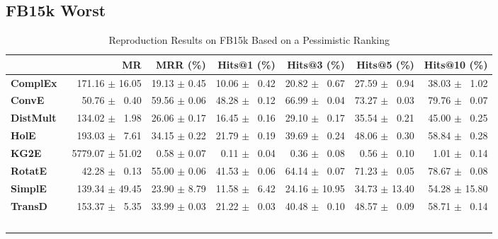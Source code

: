 \documentclass[journal]{IEEEtran}
\begin{document}
\subsection{FB15k Worst}
    \begin{table*}
        \caption{Reproduction Results on FB15k Based on a Pessimistic Ranking}
        \label{tab:fb15k_full_results_pessimistic_ranking}
        \centering
        \begin{tabular}{lrrrrrr}
\toprule
{} &                MR &      MRR (\%) &    Hits@1 (\%) &    Hits@3 (\%) &    Hits@5 (\%) &   Hits@10 (\%) \\
\midrule
\textbf{ComplEx } &  $\phantom{5}$$\phantom{5}$171.16 $\pm$ 16.05 &  19.13 $\pm$ 0.45 &  10.06 $\pm$ $\phantom{5}$0.42 &  20.82 $\pm$ $\phantom{5}$0.67 &  27.59 $\pm$ $\phantom{5}$0.94 &  38.03 $\pm$ $\phantom{5}$1.02 \\
\textbf{ConvE   } &  $\phantom{5}$$\phantom{5}$$\phantom{5}$50.76 $\pm$ $\phantom{5}$0.40 &  59.56 $\pm$ 0.06 &  48.28 $\pm$ $\phantom{5}$0.12 &  66.99 $\pm$ $\phantom{5}$0.04 &  73.27 $\pm$ $\phantom{5}$0.03 &  79.76 $\pm$ $\phantom{5}$0.07 \\
\textbf{DistMult} &  $\phantom{5}$$\phantom{5}$134.02 $\pm$ $\phantom{5}$1.98 &  26.06 $\pm$ 0.17 &  16.45 $\pm$ $\phantom{5}$0.16 &  29.10 $\pm$ $\phantom{5}$0.17 &  35.54 $\pm$ $\phantom{5}$0.21 &  45.00 $\pm$ $\phantom{5}$0.25 \\
\textbf{HolE    } &  $\phantom{5}$$\phantom{5}$193.03 $\pm$ $\phantom{5}$7.61 &  34.15 $\pm$ 0.22 &  21.79 $\pm$ $\phantom{5}$0.19 &  39.69 $\pm$ $\phantom{5}$0.24 &  48.06 $\pm$ $\phantom{5}$0.30 &  58.84 $\pm$ $\phantom{5}$0.28 \\
\textbf{KG2E    } &  $\phantom{5}$5779.07 $\pm$ 51.02 &  $\phantom{5}$0.58 $\pm$ 0.07 &  $\phantom{5}$0.11 $\pm$ $\phantom{5}$0.04 &  $\phantom{5}$0.36 $\pm$ $\phantom{5}$0.08 &  $\phantom{5}$0.56 $\pm$ $\phantom{5}$0.10 &  $\phantom{5}$1.01 $\pm$ $\phantom{5}$0.14 \\
\textbf{RotatE  } &  $\phantom{5}$$\phantom{5}$$\phantom{5}$42.28 $\pm$ $\phantom{5}$0.13 &  55.00 $\pm$ 0.06 &  41.53 $\pm$ $\phantom{5}$0.06 &  64.14 $\pm$ $\phantom{5}$0.07 &  71.23 $\pm$ $\phantom{5}$0.05 &  78.67 $\pm$ $\phantom{5}$0.08 \\
\textbf{SimplE  } &  $\phantom{5}$$\phantom{5}$139.34 $\pm$ 49.45 &  23.90 $\pm$ 8.79 &  11.58 $\pm$ $\phantom{5}$6.42 &  24.16 $\pm$ 10.95 &  34.73 $\pm$ 13.40 &  54.28 $\pm$ 15.80 \\
\textbf{TransD  } &  $\phantom{5}$$\phantom{5}$153.37 $\pm$ $\phantom{5}$5.35 &  33.99 $\pm$ 0.03 &  21.22 $\pm$ $\phantom{5}$0.03 &  40.48 $\pm$ $\phantom{5}$0.10 &  48.57 $\pm$ $\phantom{5}$0.09 &  58.71 $\pm$ $\phantom{5}$0.14 \\
$$
\end{tabular}
\end{table*}
\end{document}
